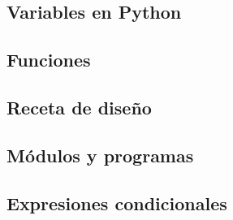 \documentclass[12pt,xcolor={dvipsnames,x11names},t,table]{beamer}
\begin{document}
\subsection{Variables en Python}


\subsection{Funciones}




\subsection{Receta de diseño}


\subsection{Módulos y programas}



\subsection{Expresiones condicionales}




\end{document}
